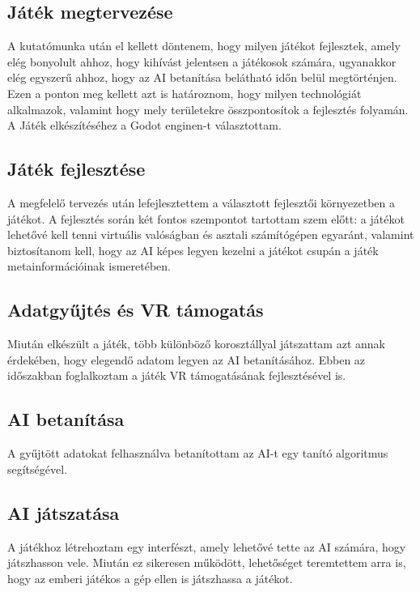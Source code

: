 \subsection{Játék megtervezése}
A kutatómunka után el kellett döntenem, hogy milyen játékot fejlesztek, amely elég bonyolult ahhoz, hogy kihívást jelentsen a játékosok számára, ugyanakkor elég egyszerű ahhoz, hogy az AI betanítása belátható időn belül megtörténjen. Ezen a ponton meg kellett azt is határoznom, hogy milyen technológiát alkalmazok, valamint hogy mely területekre összpontosítok a fejlesztés folyamán. A Játék elkészítéséhez a Godot enginen-t választottam.

\subsection{Játék fejlesztése}
A megfelelő tervezés után lefejlesztettem a választott fejlesztői környezetben a játékot. A fejlesztés során két fontos szempontot tartottam szem előtt: a játékot lehetővé kell tenni virtuális valóságban és asztali számítógépen egyaránt, valamint biztosítanom kell, hogy az AI képes legyen kezelni a játékot csupán a játék metainformációinak ismeretében.

\subsection{Adatgyűjtés és VR támogatás}
Miután elkészült a játék, több különböző korosztállyal játszattam azt annak érdekében, hogy elegendő adatom legyen az AI betanításához. Ebben az időszakban foglalkoztam a játék VR támogatásának fejlesztésével is.

\subsection{AI betanítása}
A gyűjtött adatokat felhasználva betanítottam az AI-t egy tanító algoritmus segítségével.

\subsection{AI játszatása}
A játékhoz létrehoztam egy interfészt, amely lehetővé tette az AI számára, hogy játszhasson vele. Miután ez sikeresen működött, lehetőséget teremtettem arra is, hogy az emberi játékos a gép ellen is játszhassa a játékot.